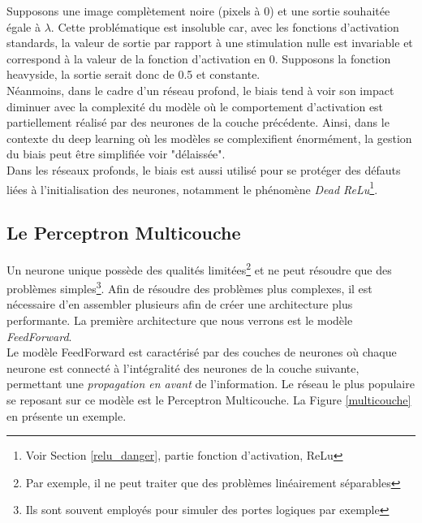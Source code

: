 \noindent Supposons une image complètement noire (pixels à 0) et une sortie souhaitée égale à $\lambda$. Cette problématique est insoluble car, avec les fonctions d'activation standards, la valeur de sortie par rapport à une stimulation nulle est invariable et correspond à la valeur de la fonction d'activation en 0. Supposons la fonction heavyside, la sortie serait donc de 0.5 et constante.\\

\noindent Néanmoins, dans le cadre d'un réseau profond, le biais tend à voir son impact diminuer avec la complexité du modèle où le comportement d'activation est partiellement réalisé par des neurones de la couche précédente. Ainsi, dans le contexte du deep learning où les modèles se complexifient énormément, la gestion du biais peut être simplifiée voir "délaissée".\\

\noindent Dans les réseaux profonds, le biais est aussi utilisé pour se protéger des défauts liées à l'initialisation des neurones, notamment le phénomène \textit{Dead ReLu}\footnote{Voir Section \ref{relu_danger}, partie fonction d'activation, ReLu}.

\subsection{Le Perceptron Multicouche}

Un neurone unique possède des qualités limitées\footnote{Par exemple, il ne peut traiter que des problèmes linéairement séparables} et ne peut résoudre que des problèmes simples\footnote{Ils sont souvent employés pour simuler des portes logiques par exemple}. Afin de résoudre des problèmes plus complexes, il est nécessaire d'en assembler plusieurs afin de créer une architecture plus performante. La première architecture que nous verrons est le modèle \textit{FeedForward}.\\

\noindent Le modèle FeedForward est caractérisé par des couches de neurones où chaque neurone est connecté à l'intégralité des neurones de la couche suivante, permettant une \textit{propagation en avant} de l'information. Le réseau le plus populaire se reposant sur ce modèle est le Perceptron Multicouche. La Figure \ref{multicouche} en présente un exemple.\\

